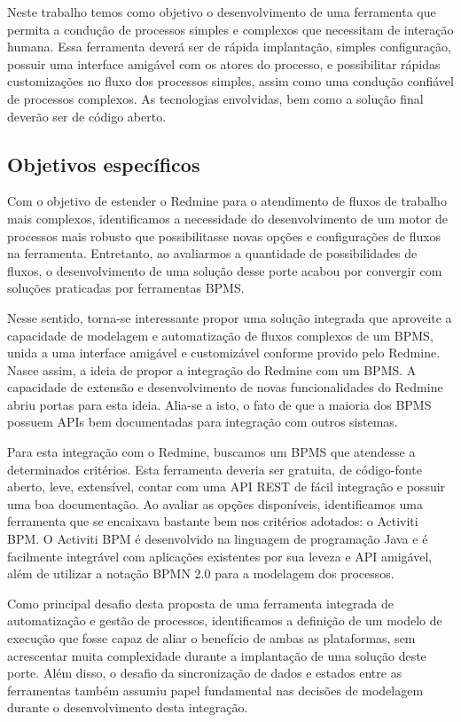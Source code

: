Neste trabalho temos como objetivo o desenvolvimento de uma ferramenta que permita a condução de processos simples e complexos que necessitam de interação humana. Essa ferramenta deverá ser de rápida implantação, simples configuração, possuir uma interface amigável com os atores do processo, e possibilitar rápidas customizações no fluxo dos processos simples, assim como uma condução confiável de processos complexos. As tecnologias envolvidas, bem como a solução final deverão ser de código aberto.

\subsection{Objetivos específicos}\label{sec:introducao-objetivos-especificos}

Com o objetivo de estender o Redmine para o atendimento de fluxos de trabalho mais complexos, identificamos a necessidade do desenvolvimento de um motor de processos mais robusto que possibilitasse novas opções e configurações de fluxos na ferramenta. Entretanto, ao avaliarmos a quantidade de possibilidades de fluxos, o desenvolvimento de uma solução desse porte acabou por convergir com soluções praticadas por ferramentas BPMS. 

Nesse sentido, torna-se interessante propor uma solução integrada que aproveite a capacidade de modelagem e automatização de fluxos complexos de um BPMS, unida a uma interface amigável e customizável conforme provido pelo Redmine. Nasce assim, a ideia de propor a integração do Redmine com um BPMS. A capacidade de extensão e desenvolvimento de novas funcionalidades do Redmine abriu portas para esta ideia. Alia-se a isto, o fato de que a maioria dos BPMS possuem APIs\cite{api} bem documentadas para integração com outros sistemas.

Para esta integração com o Redmine, buscamos um BPMS que atendesse a determinados critérios. Esta ferramenta deveria ser gratuita, de código-fonte aberto, leve, extensível, contar com uma API\cite{api} REST\cite{rest} de fácil integração e possuir uma boa documentação. Ao avaliar as opções disponíveis, identificamos uma ferramenta que se encaixava bastante bem nos critérios adotados: o Activiti BPM. O Activiti BPM é desenvolvido na linguagem de programação Java\cite{java-history} e é facilmente integrável com aplicações existentes por sua leveza e API\cite{api} amigável, além de utilizar a notação BPMN 2.0\cite{bpmn20} para a modelagem dos processos.

Como principal desafio desta proposta de uma ferramenta integrada de automatização e gestão de processos, identificamos a definição de um modelo de execução que fosse capaz de aliar o benefício de ambas as plataformas, sem acrescentar muita complexidade durante a implantação de uma solução deste porte. Além disso, o desafio da sincronização de dados e estados entre as ferramentas também assumiu papel fundamental nas decisões de modelagem durante o desenvolvimento desta integração.


